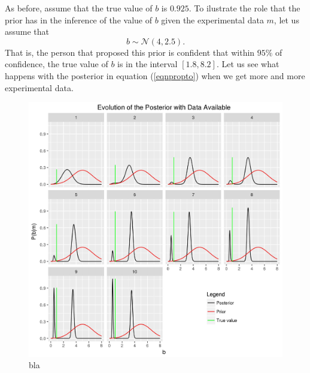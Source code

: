 \documentclass[12pt]{book}
\begin{document}
As before, assume that the true
value of $b$ is $0.925$. To ilustrate the role that the prior has in the inference of the value
of $b$ given the experimental data $m$, let us assume that 
\begin{equation*}
b\sim\mathscr{N}(4,2.5).
\end{equation*}
That is, the person that proposed this prior is confident that within $95\%$ of confidence, the true value of
$b$ is in the interval $[1.8,8.2]$. Let us see what happens with the posterior in equation (\ref{eqnpropto})
when we get more and more experimental data. 
\begin{figure}[H]
\centering
\includegraphics[scale=0.7]{./FigChap3/posterior_evolution}
\caption{bla}
\end{figure}


\end{document}

